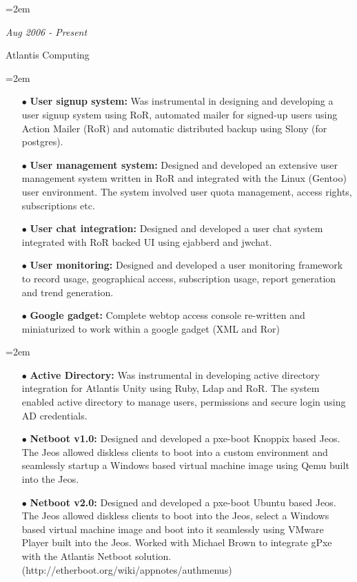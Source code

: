 \documentclass{scrartcl}	%
\newcommand{\MarginDate}[1]{\marginpar{\raggedleft\itshape\small#1}}
\newlength{\datebox}\settowidth{\datebox}{August 2006 - Present}
\newcommand{\NewWorkExperience}[3]{\noindent\hangindent=2em\hangafter=0 \parbox{\datebox}{\textit{#1}}\hspace{1.5em}
  #2 #3%
\vspace{0.5em}}
\newcommand{\Description}[1]{\hangindent=2em\hangafter=0\noindent\raggedright\footnotesize{#1}\par\normalsize}
\begin{document}
\begin{cv}{
}
\vspace{1.5em}

\noindent{}
\vspace{0.5em}

\NewWorkExperience{\small{Aug 2006 - Present}}{\small{Atlantis
    Computing}}{}

\Description{
\begin{itemize}
  \item[\footnotesize$\bullet$] \textbf{User signup system: }Was
    instrumental in designing\MarginDate{Atlantis Webtop}
    and developing a user signup system using RoR, automated mailer for
    signed-up users using Action Mailer (RoR) and automatic distributed backup using Slony (for postgres).
  \item[\footnotesize$\bullet$] \textbf{User management system: }Designed and developed an
    extensive user management system written in RoR and integrated
    with the Linux (Gentoo) user environment. The system involved user
    quota management, access rights, subscriptions etc.
  \item[\footnotesize$\bullet$] \textbf{User chat integration: } Designed and developed a user chat system integrated with RoR backed UI using ejabberd and jwchat.
  \item[\footnotesize$\bullet$] \textbf{User monitoring: }Designed and developed a user
    monitoring framework to record usage, geographical access,
    subscription usage, report generation and trend generation.
  \item[\footnotesize$\bullet$] \textbf{Google gadget: }Complete
    webtop access console re-written and miniaturized to work within a
    google gadget (XML and Ror)
\end{itemize}
}

\vspace{0.5em}

\Description{
\begin{itemize}
  \item[\footnotesize$\bullet$] \textbf{Active Directory: }Was
    instrumental in developing \MarginDate{Atlantis Unity}
    active directory integration for Atlantis Unity using Ruby, Ldap
    and RoR. The system
    enabled active directory to manage users, permissions and secure
    login using AD credentials.
  \item[\footnotesize$\bullet$] \textbf{Netboot v1.0: }Designed and
    developed a pxe-boot Knoppix based Jeos. The Jeos allowed diskless
    clients to boot into a custom environment and seamlessly
    startup a Windows based virtual machine image using Qemu built into the Jeos.
  \item[\footnotesize$\bullet$] \textbf{Netboot v2.0: }Designed and
    developed a pxe-boot Ubuntu based Jeos. The Jeos allowed diskless
    clients to boot into the Jeos, select a Windows based virtual
    machine image and boot into it seamlessly using VMware Player
    built into the Jeos. Worked with Michael Brown to integrate gPxe
    with the Atlantis Netboot
    solution.\\(http://etherboot.org/wiki/appnotes/authmenus)
\end{itemize}
}


\end{cv}
\end{document}
